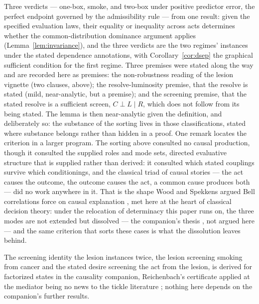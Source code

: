 Three verdicts --- one-box, smoke, and two-box under positive predictor error, the perfect endpoint governed by the admissibility rule --- from one result: given the specified evaluation laws, their equality or inequality across acts determines whether the common-distribution dominance argument applies (Lemma~\ref{lem:invariance}), and the three verdicts are the two regimes' instances under the stated dependence annotations, with Corollary~\ref{cor:dsep} the graphical sufficient condition for the first regime. Three premises were stated along the way and are recorded here as premises: the non-robustness reading of the lesion vignette (two clauses, above); the resolve-luminosity premise, that the resolve is stated (mild, near-analytic, but a premise); and the screening premise, that the stated resolve is a sufficient screen, $C \perp L \mid R$, which does not follow from its being stated. The lemma is then near-analytic given the definition, and deliberately so: the substance of the sorting lives in those classifications, stated where substance belongs rather than hidden in a proof. One remark locates the criterion in a larger program. The sorting above consulted no causal production, though it consulted the supplied roles and mode sets, directed evaluative structure that is supplied rather than derived: it consulted which stated couplings survive which conditionings, and the classical triad of causal stories --- the act causes the outcome, the outcome causes the act, a common cause produces both --- did no work anywhere in it. That is the shape Wood and Spekkens argued Bell correlations force on causal explanation \cite{wood_spekkens_2015}, met here at the heart of classical decision theory: under the relocation of determinacy this paper runs on, the three modes are not extended but dissolved --- the companion's thesis \cite{Aethus}, not argued here --- and the same criterion that sorts these cases is what the dissolution leaves behind.

The screening identity the lesion instances twice, the lesion screening smoking from cancer and the stated desire screening the act from the lesion, is derived for factorized states in the causality companion, Reichenbach's certificate applied at the mediator being no news to the tickle literature \cite{reichenbach1956direction, eells1982rational, AethusCausality}; nothing here depends on the companion's further results.

